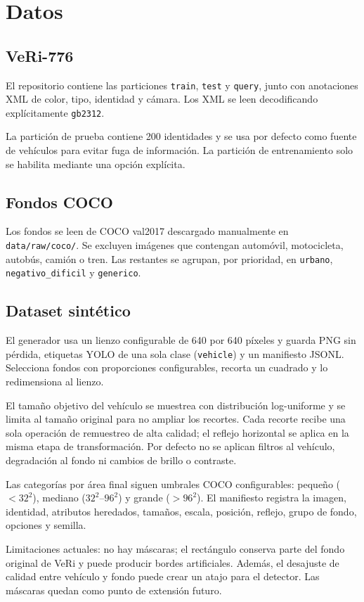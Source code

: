 \section{Datos}

\subsection{VeRi-776}

El repositorio contiene las particiones \texttt{train}, \texttt{test} y
\texttt{query}, junto con anotaciones XML de color, tipo, identidad y cámara.
Los XML se leen decodificando explícitamente \texttt{gb2312}.

La partición de prueba contiene 200 identidades y se usa por defecto como
fuente de vehículos para evitar fuga de información. La partición de
entrenamiento solo se habilita mediante una opción explícita.

\subsection{Fondos COCO}

Los fondos se leen de COCO val2017 descargado manualmente en
\texttt{data/raw/coco/}. Se excluyen imágenes que contengan automóvil,
motocicleta, autobús, camión o tren. Las restantes se agrupan, por prioridad,
en \texttt{urbano}, \texttt{negativo\_dificil} y \texttt{generico}.

\subsection{Dataset sintético}

El generador usa un lienzo configurable de 640 por 640 píxeles y guarda PNG
sin pérdida, etiquetas YOLO de una sola clase (\texttt{vehicle}) y un
manifiesto JSONL. Selecciona fondos con proporciones configurables, recorta un
cuadrado y lo redimensiona al lienzo.

El tamaño objetivo del vehículo se muestrea con distribución log-uniforme y
se limita al tamaño original para no ampliar los recortes. Cada recorte recibe
una sola operación de remuestreo de alta calidad; el reflejo horizontal se
aplica en la misma etapa de transformación. Por defecto no se aplican filtros
al vehículo, degradación al fondo ni cambios de brillo o contraste.

Las categorías por área final siguen umbrales COCO configurables: pequeño
($<32^2$), mediano ($32^2$--$96^2$) y grande ($>96^2$). El manifiesto registra
la imagen, identidad, atributos heredados, tamaños, escala, posición, reflejo,
grupo de fondo, opciones y semilla.

Limitaciones actuales: no hay máscaras; el rectángulo conserva parte del fondo
original de VeRi y puede producir bordes artificiales. Además, el desajuste de
calidad entre vehículo y fondo puede crear un atajo para el detector. Las
máscaras quedan como punto de extensión futuro.
